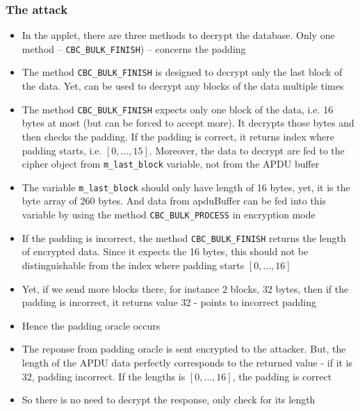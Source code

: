 \documentclass[11pt,a4paper]{article}
\begin{document}
\subsubsection*{The attack}

\begin{itemize}
\item In the applet, there are three methods to decrypt the database. Only one method -- \texttt{CBC\_BULK\_FINISH}) -- concerns the padding
\item The method \texttt{CBC\_BULK\_FINISH} is designed to decrypt only the last block of the data. Yet, can be used to decrypt any blocks of the data multiple times 
\item The method \texttt{CBC\_BULK\_FINISH} expects only one block of the data, i.e. 16 bytes at most (but can be forced to accept more). It decrypts those bytes and then checks the padding. If the padding is correct, it returns index where padding starts, i.e. $[0,\dots,15]$. Moreover, the data to decrypt are fed to the cipher object from \texttt{m\_last\_block} variable, not from the APDU buffer
\item The variable \texttt{m\_last\_block} should only have length of 16 bytes, yet, it is the byte array of 260 bytes. And data from apduBuffer can be fed into this variable by using the method \texttt{CBC\_BULK\_PROCESS} in encryption mode
\item If the padding is incorrect, the method \texttt{CBC\_BULK\_FINISH} returns the length of encrypted data. Since it expects the 16 bytes, this should not be distinguishable from the index where padding starts $[0,\dots,16]$
\item Yet, if we send more blocks there, for instance 2 blocks, 32 bytes, then if the padding is incorrect, it returns value 32 - points to incorrect padding
\item Hence the padding oracle occurs
\item The reponse from padding oracle is sent encrypted to the attacker. But, the length of the APDU data perfectly corresponds to the returned value - if it is 32, padding incorrect. If the lengths is $[0,\dots,16]$, the padding is correct
\item So there is no need to decrypt the response, only check for its length
\end{itemize}
\end{document}
